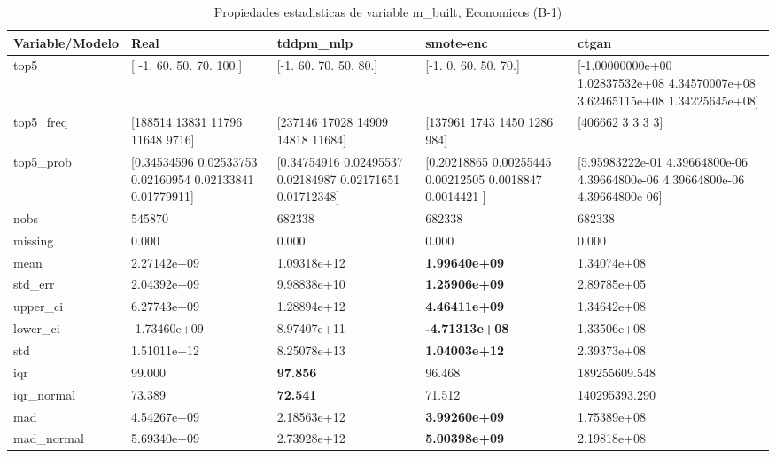 \begin{table}[H]
\centering
\fontsize{8}{14}\selectfont
\caption{Propiedades  estadisticas de variable m\_built, Economicos (B-1)}
\label{table-stats-economicos-b-1-m_built}
\begin{tabular}{|l|m{10em}|m{10em}|m{10em}|m{10em}|}
\hline
 \rowcolor[gray]{0.8}
Variable/Modelo & Real & tddpm\_mlp & smote-enc & ctgan \\
\hline top5 & [ -1.  60.  50.  70. 100.] & [-1. 60. 70. 50. 80.] & [-1.  0. 60. 50. 70.] & [-1.00000000e+00  1.02837532e+08  4.34570007e+08  3.62465115e+08
  1.34225645e+08] \\
\hline top5\_freq & [188514  13831  11796  11648   9716] & [237146  17028  14909  14818  11684] & [137961   1743   1450   1286    984] & [406662      3      3      3      3] \\
\hline top5\_prob & [0.34534596 0.02533753 0.02160954 0.02133841 0.01779911] & [0.34754916 0.02495537 0.02184987 0.02171651 0.01712348] & [0.20218865 0.00255445 0.00212505 0.0018847  0.0014421 ] & [5.95983222e-01 4.39664800e-06 4.39664800e-06 4.39664800e-06
 4.39664800e-06] \\
\hline nobs & 545870 & 682338 & 682338 & 682338 \\
\hline missing & 0.000 & 0.000 & 0.000 & 0.000 \\
\hline mean & 2.27142e+09 & \cellcolor[rgb]{0.9, 0.54, 0.52} 1.09318e+12 & \bfseries 1.99640e+09 & 1.34074e+08 \\
\hline std\_err & 2.04392e+09 & \cellcolor[rgb]{0.9, 0.54, 0.52} 9.98838e+10 & \bfseries 1.25906e+09 & 2.89785e+05 \\
\hline upper\_ci & 6.27743e+09 & \cellcolor[rgb]{0.9, 0.54, 0.52} 1.28894e+12 & \bfseries 4.46411e+09 & 1.34642e+08 \\
\hline lower\_ci & -1.73460e+09 & \cellcolor[rgb]{0.9, 0.54, 0.52} 8.97407e+11 & \bfseries -4.71313e+08 & 1.33506e+08 \\
\hline std & 1.51011e+12 & \cellcolor[rgb]{0.9, 0.54, 0.52} 8.25078e+13 & \bfseries 1.04003e+12 & 2.39373e+08 \\
\hline iqr & 99.000 & \bfseries 97.856 & 96.468 & \cellcolor[rgb]{0.9, 0.54, 0.52} 189255609.548 \\
\hline iqr\_normal & 73.389 & \bfseries 72.541 & 71.512 & \cellcolor[rgb]{0.9, 0.54, 0.52} 140295393.290 \\
\hline mad & 4.54267e+09 & \cellcolor[rgb]{0.9, 0.54, 0.52} 2.18563e+12 & \bfseries 3.99260e+09 & 1.75389e+08 \\
\hline mad\_normal & 5.69340e+09 & \cellcolor[rgb]{0.9, 0.54, 0.52} 2.73928e+12 & \bfseries 5.00398e+09 & 2.19818e+08 \\

\end{tabular}
\end{table}
